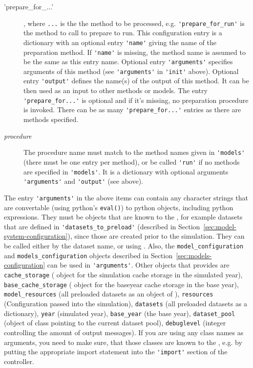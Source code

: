 \begin{description}
\item['prepare_for_...'], where \verb|...| is the the method
to be processed, e.g. \verb|'prepare_for_run'| is the method to call to prepare
to run. This configuration entry is a dictionary with an
optional entry \verb|'name'| giving the name of the preparation method. If \verb|'name'| is
missing, the method name is assumed to be the same as this entry name. Optional
entry \verb|'arguments'| specifies arguments of this method (see \verb|'arguments'| in \verb|'init'|
above). Optional entry \verb|'output'| defines the name(s) of the output of this
method.  It can be then used as an input to other methods or models. The entry
\verb|'prepare_for...'| is optional and if it's missing, no preparation procedure is
invoked. There can be as many \verb|'prepare_for...'| entries as there are
methods specified.
\item[{\it procedure}] The procedure name must match to the method names given
in \verb|'models'| (there must be one entry per method), or be called \verb|'run'| if no
methods are specified in \verb|'models'|. It is a dictionary with optional arguments
\verb|'arguments'| and \verb|'output'| (see above).
\end{description}

The entry \verb|'arguments'| in the above items can contain any character
strings that are convertable (using python's \verb|eval()|) to python objects,
including python expressions. They must be objects that are known to the
, for example datasets that are defined in
\verb|'datasets_to_preload'| (described in
Section~\ref{sec:model-system-configuration}), since those are created prior to
the simulation. They can be called either by the dataset name, or using
. Also, the \verb|model_configuration| and
\verb|models_configuration| objects described in
Section~\ref{sec:models-configuration} can be used in \verb|'arguments'|. Other
objects that  provides are  \verb|cache_storage|
( object for the simulation cache storage
in the simulated year), \verb|base_cache_storage| ( object for
the baseyear cache storage in the base year),
\verb|model_resources| (all preloaded datasets as an object of
),  \verb|resources|
(Configuration passed into the simulation), \verb|datasets| (all preloaded datasets as a dictionary),
\verb|year| (simulated year), \verb|base_year| (the base year),
\verb|dataset_pool| (object of class  pointing to the current
dataset pool), \verb|debuglevel| (integer controlling the amount of output messages).  
If you are using any class names
as arguments, you need to make sure, that those classes are known to the
, e.g. by putting the appropriate import statement into the
\verb|'import'| section of the controller.

